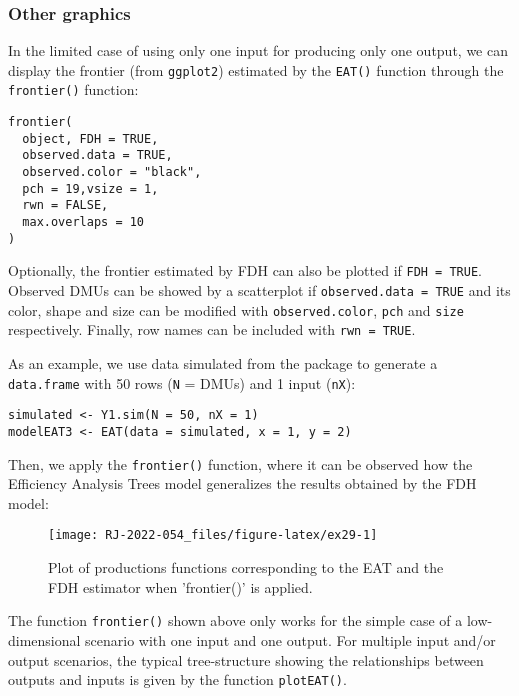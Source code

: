 \hypertarget{other-graphics}{%
\subsubsection{Other graphics}\label{other-graphics}}

In the limited case of using only one input for producing only one output, we can display the frontier (from \texttt{ggplot2}) estimated by the \texttt{EAT()} function through the \texttt{frontier()} function:

\begin{verbatim}
frontier(
  object, FDH = TRUE,
  observed.data = TRUE,
  observed.color = "black",
  pch = 19,vsize = 1,
  rwn = FALSE,
  max.overlaps = 10
)
\end{verbatim}

Optionally, the frontier estimated by FDH can also be plotted if \texttt{FDH\ =\ TRUE}. Observed DMUs can be showed by a scatterplot if \texttt{observed.data\ =\ TRUE} and its color, shape and size can be modified with \texttt{observed.color}, \texttt{pch} and \texttt{size} respectively. Finally, row names can be included with \texttt{rwn\ =\ TRUE}.

As an example, we use data simulated from the  package to generate a \texttt{data.frame} with 50 rows (\texttt{N} = DMUs) and 1 input (\texttt{nX}):

\begin{verbatim}
simulated <- Y1.sim(N = 50, nX = 1)
modelEAT3 <- EAT(data = simulated, x = 1, y = 2)
\end{verbatim}

Then, we apply the \texttt{frontier()} function, where it can be observed how the Efficiency Analysis Trees model generalizes the results obtained by the FDH model:

\begin{figure}

{\centering \texttt{[image: RJ-2022-054\_files/figure-latex/ex29-1]} 

}

\caption{Plot of productions functions corresponding to the EAT and the FDH estimator when 'frontier()' is applied.}\label{fig:ex29}
\end{figure}

The function \texttt{frontier()} shown above only works for the simple case of a low-dimensional scenario with one input and one output. For multiple input and/or output scenarios, the typical tree-structure showing the relationships between outputs and inputs is given by the function \texttt{plotEAT()}.

